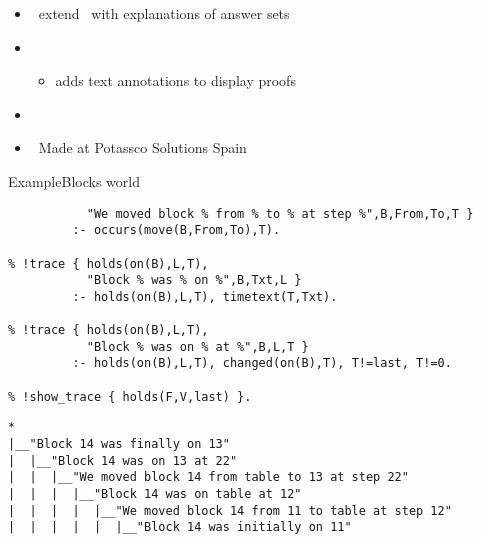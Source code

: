\begin{frame}{\xclingo}
  \begin{itemize}
  \item {} \ extend \clingo\ with explanations of answer sets
  \item {} \
    \begin{itemize}
    \item adds text annotations to display proofs
    \end{itemize}
  \item {} \ \cite{cafabr20a}
  \item {} \ Made at Potassco Solutions Spain
  \end{itemize}
\end{frame}
\begin{frame}[fragile,shrink]{Example}{Blocks world}
\begin{lstlisting}[language=clingo,commentstyle={\color{white}},basicstyle=\scriptsize\ttfamily]
% !trace { occurs(move(B,From,To),T),
           "We moved block % from % to % at step %",B,From,To,T }
         :- occurs(move(B,From,To),T).

% !trace { holds(on(B),L,T),
           "Block % was % on %",B,Txt,L }
         :- holds(on(B),L,T), timetext(T,Txt).

% !trace { holds(on(B),L,T),
           "Block % was on % at %",B,L,T }
         :- holds(on(B),L,T), changed(on(B),T), T!=last, T!=0.

% !show_trace { holds(F,V,last) }.
\end{lstlisting}
\pause
\begin{lstlisting}[language=clingo,basicstyle=\scriptsize\ttfamily]
*
|__"Block 14 was finally on 13"
|  |__"Block 14 was on 13 at 22"
|  |  |__"We moved block 14 from table to 13 at step 22"
|  |  |  |__"Block 14 was on table at 12"
|  |  |  |  |__"We moved block 14 from 11 to table at step 12"
|  |  |  |  |  |__"Block 14 was initially on 11"
\end{lstlisting}
\end{frame}
%

